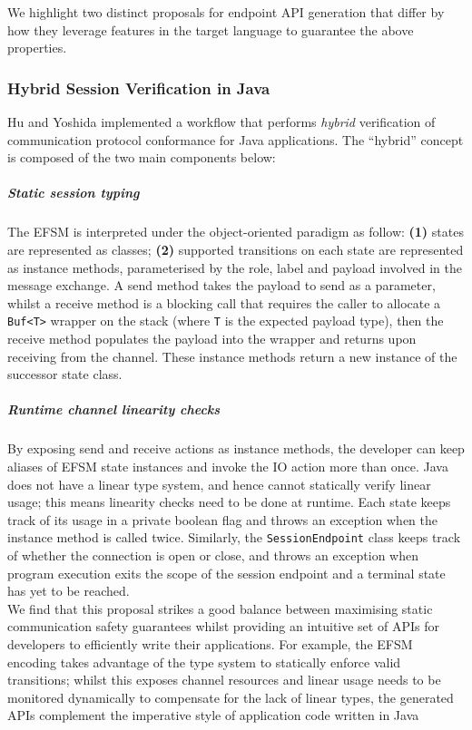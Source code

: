 We highlight two distinct proposals for endpoint
API generation that differ
by how they leverage features in the target language
to guarantee the above properties.

\subsubsection{Hybrid Session Verification in Java \cite{Hybrid2016}}
Hu and Yoshida implemented a workflow
that performs \textit{hybrid} verification of 
communication protocol conformance for Java applications.
The ``hybrid'' concept is composed of the two main components below:

\subparagraph{Static session typing}
The EFSM is interpreted under the object-oriented paradigm as follow:
\textbf{(1)} states are represented as classes;
\textbf{(2)} supported transitions on each state are 
represented as instance methods,
parameterised by the role, label and payload involved 
in the message exchange. 
A send method takes the payload to send as a parameter,
whilst a receive method is a blocking call that 
requires the caller to allocate a \texttt{Buf<T>} wrapper 
on the stack (where \texttt{T} is the expected payload type),
then the receive method populates the payload into 
the wrapper and returns upon receiving from the channel. 
These instance methods return a new instance of 
the successor state class.

\subparagraph{Runtime channel linearity checks}
By exposing send and receive actions as instance
methods, the developer can keep aliases of EFSM state instances
and invoke the IO action more than once. Java does not
have a linear type system, and hence cannot statically
verify linear usage; this means linearity checks need to be
done at runtime.
Each state keeps track of its usage in a private boolean flag 
and throws an exception when the instance method is called twice.
Similarly, the \texttt{SessionEndpoint} class keeps track of 
whether the connection is open or close,
and throws an exception when program execution exits the 
scope of the session endpoint and a terminal state 
has yet to be reached.\\

We find that this proposal strikes a good balance 
between maximising static communication safety guarantees 
whilst providing an intuitive set of APIs for developers 
to efficiently write their applications. 
For example, the EFSM encoding takes advantage of the type system 
to statically enforce valid transitions; whilst this
exposes channel resources and linear usage needs to be
monitored dynamically to compensate for the lack of linear types,
the generated APIs complement the 
imperative style of application code written in Java


